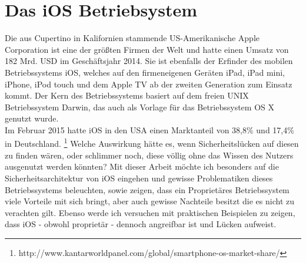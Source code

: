 \section{Das iOS Betriebsystem}
	Die aus Cupertino in Kalifornien stammende US-Amerikanische Apple Corporation
	ist eine der größten Firmen der Welt und hatte einen Umsatz von 182 Mrd.
	USD im Geschäftsjahr 2014. Sie ist ebenfalls der Erfinder des mobilen
	Betriebssystems iOS, welches auf den firmeneigenen Geräten iPad, iPad mini,
	iPhone, iPod touch und dem Apple TV ab der zweiten Generation zum Einsatz kommt.
	Der Kern des Betriebssystems basiert auf dem freien UNIX Betriebssystem Darwin,
	das auch als Vorlage für das Betriebssystem OS X genutzt wurde.\\
	Im Februar 2015 hatte iOS in den USA einen Marktanteil von 38,8\% und 17,4\%
	in Deutschland.
	\footnote{http://www.kantarworldpanel.com/global/smartphone-os-market-share/}
	Welche Auswirkung hätte es, wenn Sicherheitslücken auf diesen zu finden wären,
	oder schlimmer noch, diese völlig ohne das Wissen des Nutzers ausgenutzt werden
	könnten? Mit dieser Arbeit möchte ich besonders auf die Sicherheitsarchitektur
	von iOS eingehen und gewisse Problematiken dieses Betriebssystems beleuchten,
	sowie zeigen, dass ein Proprietäres Betriebssystem viele Vorteile mit sich
	bringt, aber auch gewisse Nachteile besitzt die es nicht zu verachten gilt.
	Ebenso werde ich versuchen mit praktischen Beispielen zu zeigen, dass iOS -
	obwohl proprietär - dennoch angreifbar ist und Lücken aufweist.
